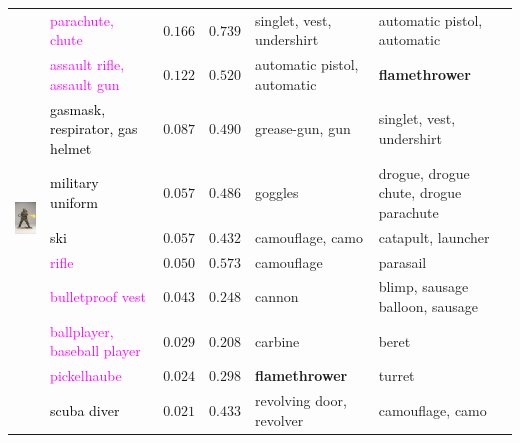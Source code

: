 \documentclass[11pt,letterpaper]{article}
\begin{document}
\begin{table}[t]
\begin{center}
\begin{small}
{\begin{tabular}{clrrll}
\multirow{10}{*}{\includegraphics[height=10em]{n03356559_12703.JPEG}}
& \textcolor{magenta}{parachute, chute} & $0.166$& $0.739$& singlet, vest, undershirt& automatic pistol, automatic \\
& \textcolor{magenta}{assault rifle, assault gun} & $0.122$& $0.520$& automatic pistol, automatic& \textbf{flamethrower} \\
& \textcolor{black}{gasmask, respirator, gas helmet} & $0.087$& $0.490$& grease-gun, gun& singlet, vest, undershirt \\
& \textcolor{black}{military uniform} & $0.057$& $0.486$& goggles& drogue, drogue chute, drogue parachute \\
& \textcolor{black}{ski} & $0.057$& $0.432$& camouflage, camo& catapult, launcher \\
& \textcolor{magenta}{rifle} & $0.050$& $0.573$& camouflage& parasail \\
& \textcolor{magenta}{bulletproof vest} & $0.043$& $0.248$& cannon& blimp, sausage balloon, sausage \\
& \textcolor{magenta}{ballplayer, baseball player} & $0.029$& $0.208$& carbine& beret \\
& \textcolor{magenta}{pickelhaube} & $0.024$& $0.298$& \textbf{flamethrower}& turret \\
& \textcolor{black}{scuba diver} & $0.021$& $0.433$& revolving door, revolver& camouflage, camo \\

\midrule


\end{tabular}}
\end{small}
\end{center}
\end{table}
\end{document}
